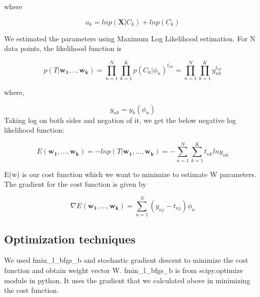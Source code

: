 \documentclass{article}
\begin{document}
where 

\begin{equation*}
a_{k} = ln p(\boldsymbol{X}|C_{k}) + ln  p(C_{k})
\end{equation*}

We estimated the parameters using Maximum Log Likelihood
estimation. For N data points, the likelihood function is

\begin{equation*}
p(T|\boldsymbol{w_{1},..,w_{k}}) = \prod\limits_{n=1}^N \prod\limits_{k=1}^K p(C_{k}|\phi_{n})^{t_{nk}} = \prod\limits_{n=1}^N \prod\limits_{k=1}^K y_{nk}^{t_{nk}}
\end{equation*}

where,

\begin{equation*}
y_{nk} = y_k(\phi_{n})
\end{equation*}
Taking log on both sides
and negation of it, we get the below negative log likelihood
function:

\begin{equation*}
E (\boldsymbol{w_{1}},..., \boldsymbol{w_{k}} ) = -ln p(T|\boldsymbol{w_{1}},...,\boldsymbol{w_{k}}) = - \sum\limits_{n=1}^N \sum\limits_{k=1}^K t_{nk} ln y_{nk}
\end{equation*}

E(w) is our cost
function which we want to minimize to estimate W parameters.
The gradient for the cost function is given by


\begin{equation*}
\nabla E (\boldsymbol{w_{1}},..., \boldsymbol{w_{k}} ) = \sum\limits_{n=1}^N(y_{nj} - t_{nj}) \phi_{n}
\end{equation*}





\subsection{Optimization techniques}
We used fmin\_l\_bfgs\_b and stochastic gradient descent to minimize the cost function and obtain weight vector W. fmin\_l\_bfgs\_b is from scipy.optimize module in python. It uses the gradient that we calculated above in minimizing the cost function.
\end{document}
